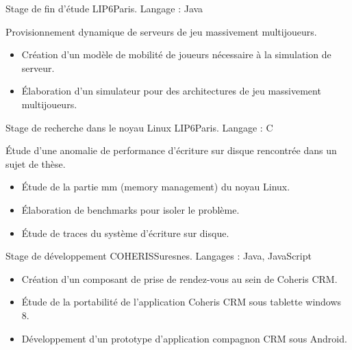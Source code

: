 \documentclass[11pt,a4paper,sans]{moderncv}
\begin{document}
\vspace{1em}

        {Stage de fin d'étude}
        {LIP6}{Paris. Langage : Java}{}
        {
            Provisionnement dynamique de serveurs de jeu massivement multijoueurs.
            \begin{itemize}
                \item Création d'un modèle de mobilité de joueurs nécessaire à la simulation de serveur.
                \item\'Elaboration d'un simulateur pour des architectures de jeu massivement multijoueurs.
            \end{itemize}
        }

\vspace{1em}

        {Stage de recherche dans le noyau Linux}
        {LIP6}{Paris. Langage : C}{}
        {
            \'Etude d'une anomalie de performance d'écriture sur disque rencontrée dans un sujet de thèse.
            \begin{itemize}
                \item\'Etude de la partie mm (memory management) du noyau Linux.
                \item\'Elaboration de benchmarks pour isoler le problème.
                \item\'Etude de traces du système d'écriture sur disque.
            \end{itemize}
        }

\vspace{1em}

        {Stage de développement}
        {COHERIS}{Suresnes. Langages : Java, JavaScript}{}
        {
            \begin{itemize}
                \item Création d'un composant de prise de rendez-vous au sein de Coheris CRM.
                \item\'Etude de la portabilité de l'application Coheris CRM sous tablette windows 8.
                \item Développement d'un prototype d'application compagnon CRM sous Android.
            \end{itemize}
        }

\vspace{0.5em}

\end{document}
